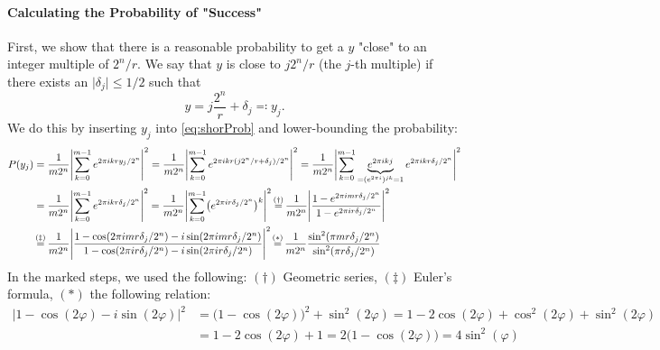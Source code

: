 				\paragraph{Calculating the Probability of "Success"}
					First, we show that there is a reasonable probability to get a \(y\) "close" to an integer multiple of \(2^n/r\). We say that \(y\) is close to \( j 2^n/r \) (the \(j\)-th multiple) if there exists an \( \lvert \delta_j \rvert \leq 1/2 \) such that
					\begin{equation}
						y = j \frac{2^n}{r} + \delta_j \eqqcolon y_j.
					\end{equation}
					We do this by inserting \(y_j\) into \eqref{eq:shorProb} and lower-bounding the probability:
					\begin{align}
						P(y_j)
						 & = \frac{1}{m 2^n} \Biggl\lvert \sum_{k = 0}^{m - 1} e^{2 \pi i k r y_j / 2^n} \Biggr\rvert^2
						= \frac{1}{m 2^n} \Biggl\lvert \sum_{k = 0}^{m - 1} e^{2 \pi i k r (j 2^n/r + \delta_j) / 2^n} \Biggr\rvert^2
						= \frac{1}{m 2^n} \Biggl\lvert \sum_{k = 0}^{m - 1} \underbrace{e^{2 \pi i k j}}_{= (e^{2 \pi i})^{jk} = 1} e^{2 \pi i k r \delta_j / 2^n} \Biggr\rvert^2                                                                                 \\
						 & = \frac{1}{m 2^n} \Biggl\lvert \sum_{k = 0}^{m - 1} e^{2 \pi i k r \delta_j / 2^n} \Biggr\rvert^2
						= \frac{1}{m 2^n} \Biggl\lvert \sum_{k = 0}^{m - 1} \bigl( e^{2 \pi i r \delta_j / 2^n} \bigr)^k \Biggr\rvert^2
						\overset{\mathclap{(\dagger)}}{=} \frac{1}{m 2^n} \Biggl\lvert \frac{1 - e^{2 \pi i m r \delta_j / 2^n}}{1 - e^{2 \pi i r \delta_j / 2^n}} \Biggr\rvert^2                                                                                 \\
						 & \overset{\mathclap{(\ddagger)}}{=} \frac{1}{m 2^n} \Biggl\lvert \frac{1 - \cos(2 \pi i m r \delta_j / 2^n) - i \sin(2 \pi i m r \delta_j / 2^n)}{1 - \cos(2 \pi i r \delta_j / 2^n) - i \sin(2 \pi i r \delta_j / 2^n)} \Biggr\rvert^2
						\overset{\mathclap{(\ast)}}{=} \frac{1}{m 2^n} \frac{\sin^2(\pi m r \delta_j / 2^n)}{\sin^2(\pi r \delta_j / 2^n)}
					\end{align}
					In the marked steps, we used the following: \((\dagger)\) Geometric series, \((\ddagger)\) Euler's formula, \((\ast)\) the following relation:
					\begin{align}
						\bigl\lvert 1 - \cos(2 \varphi) - i \sin(2 \varphi) \bigr\rvert^2
						 & = \bigl( 1 - \cos(2 \varphi) \bigr)^2 + \sin^2(2 \varphi)
						= 1 - 2 \cos(2 \varphi) + \cos^2(2 \varphi) + \sin^2(2 \varphi) \\
						 & = 1 - 2 \cos(2 \varphi) + 1
						= 2 \bigl( 1 - \cos(2 \varphi) \bigr)
						= 4 \sin^2(\varphi)
					\end{align}
